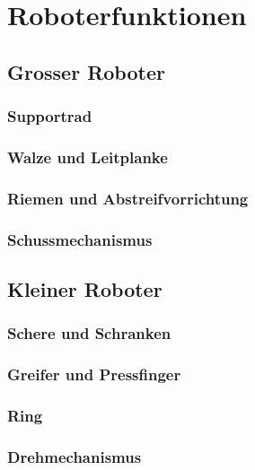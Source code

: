 \section{Roboterfunktionen}
\subsection{Grosser Roboter}

\begin{frame}
	\frametitle{Supportrad}
	
\end{frame}

\begin{frame}
	\frametitle{Walze und Leitplanke}
	
\end{frame}

\begin{frame}
	\frametitle{Riemen und Abstreifvorrichtung}
	
\end{frame}

\begin{frame}
	\frametitle{Schussmechanismus}
	
\end{frame}

\subsection{Kleiner Roboter}

\begin{frame}
	\frametitle{Schere und Schranken}
	
\end{frame}

\begin{frame}
	\frametitle{Greifer und Pressfinger}
	
\end{frame}

\begin{frame}
	\frametitle{Ring}
	
\end{frame}

\begin{frame}
	\frametitle{Drehmechanismus}
	
\end{frame}
